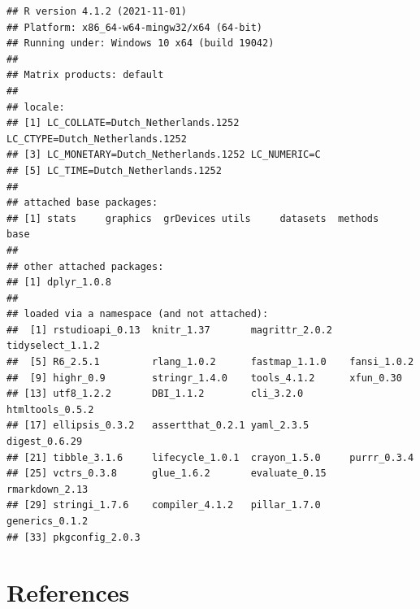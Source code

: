 \documentclass[
]{article}
\begin{document}
\begin{verbatim}
## R version 4.1.2 (2021-11-01)
## Platform: x86_64-w64-mingw32/x64 (64-bit)
## Running under: Windows 10 x64 (build 19042)
## 
## Matrix products: default
## 
## locale:
## [1] LC_COLLATE=Dutch_Netherlands.1252  LC_CTYPE=Dutch_Netherlands.1252   
## [3] LC_MONETARY=Dutch_Netherlands.1252 LC_NUMERIC=C                      
## [5] LC_TIME=Dutch_Netherlands.1252    
## 
## attached base packages:
## [1] stats     graphics  grDevices utils     datasets  methods   base     
## 
## other attached packages:
## [1] dplyr_1.0.8
## 
## loaded via a namespace (and not attached):
##  [1] rstudioapi_0.13  knitr_1.37       magrittr_2.0.2   tidyselect_1.1.2
##  [5] R6_2.5.1         rlang_1.0.2      fastmap_1.1.0    fansi_1.0.2     
##  [9] highr_0.9        stringr_1.4.0    tools_4.1.2      xfun_0.30       
## [13] utf8_1.2.2       DBI_1.1.2        cli_3.2.0        htmltools_0.5.2 
## [17] ellipsis_0.3.2   assertthat_0.2.1 yaml_2.3.5       digest_0.6.29   
## [21] tibble_3.1.6     lifecycle_1.0.1  crayon_1.5.0     purrr_0.3.4     
## [25] vctrs_0.3.8      glue_1.6.2       evaluate_0.15    rmarkdown_2.13  
## [29] stringi_1.7.6    compiler_4.1.2   pillar_1.7.0     generics_0.1.2  
## [33] pkgconfig_2.0.3
\end{verbatim}

\hypertarget{references}{%
\section*{References}\label{references}}
\end{document}
